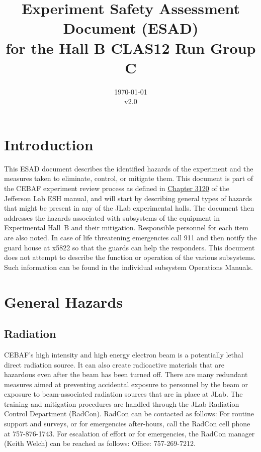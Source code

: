 \documentclass[11pt]{report}
\begin{document}
\title{ Experiment Safety Assessment Document (ESAD) \\ 
for the Hall B CLAS12 Run Group C}
\date{\today\\v2.0}
%
%
%
\maketitle
\tableofcontents

\chapter{Introduction}

This ESAD document describes the identified hazards of the experiment and the measures 
taken to eliminate, control, or mitigate them. This document is part of the CEBAF 
experiment review process as defined in
\href{http://www.jlab.org/ESH/ESHmanual/manual/3120.html}{Chapter 3120} of the Jefferson 
Lab ESH manual, and will start by describing general types of hazards that might be 
present in any of the JLab experimental halls.  The document then addresses the hazards 
associated with subsystems of the equipment in Experimental Hall~B and their mitigation.  
Responsible personnel for each item are also noted. In case of life threatening emergencies 
call 911 and then notify the guard house at x5822 so that the guards can help the 
responders.  This document does not attempt to describe the function or operation of the 
various subsystems. Such information can be found in the individual subsystem Operations 
Manuals.

\chapter{General Hazards}

\section{Radiation}
	
CEBAF's high intensity and high energy electron beam is a potentially lethal direct 
radiation source. It can also create radioactive materials that are hazardous even after 
the beam has been turned off. There are many redundant measures aimed at preventing 
accidental exposure to personnel by the beam or exposure to beam-associated radiation 
sources that are in place at JLab. The training and mitigation procedures are handled 
through the JLab Radiation Control Department (RadCon). RadCon can be contacted as follows: 
For routine support and surveys, or for emergencies after-hours, call the RadCon cell phone 
at 757-876-1743. For escalation of effort or for emergencies, the RadCon manager (Keith Welch) 
can be reached as follows: Office: 757-269-7212.
\end{document}
